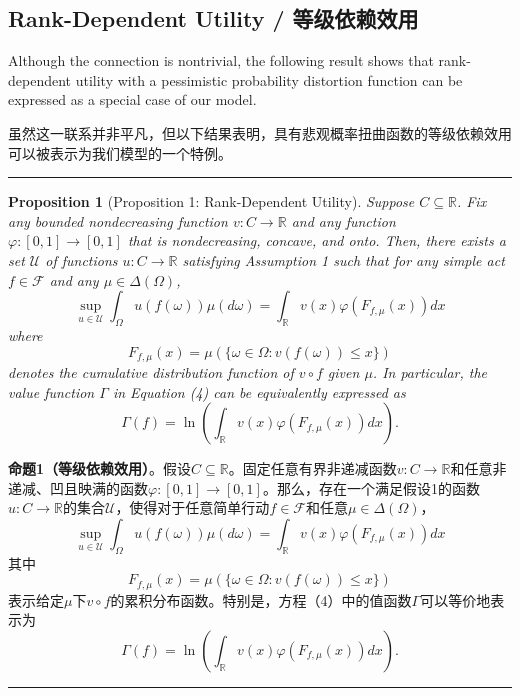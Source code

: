 \documentclass[12pt,a4paper]{article}
\newenvironment{original}
  {\par\noindent\color{black}\smallskip}
  {\par\smallskip}
\newenvironment{translation}
  {\par\noindent\color{blue!70!black}\smallskip}
  {\par\medskip\hrule\medskip}
\newtheorem{proposition}[theorem]{Proposition}
\begin{document}
\subsection{Rank-Dependent Utility / 等级依赖效用}

\begin{original}
Although the connection is nontrivial, the following result shows that rank-dependent utility with a pessimistic probability distortion function can be expressed as a special case of our model.
\end{original}
\begin{translation}
虽然这一联系并非平凡，但以下结果表明，具有悲观概率扭曲函数的等级依赖效用可以被表示为我们模型的一个特例。
\end{translation}

\begin{proposition}[Proposition 1: Rank-Dependent Utility]
Suppose $C \subseteq \mathbb{R}$. Fix any bounded nondecreasing function $v: C \to \mathbb{R}$ and any function $\varphi: [0, 1] \to [0, 1]$ that is nondecreasing, concave, and onto. Then, there exists a set $\mathcal{U}$ of functions $u: C \to \mathbb{R}$ satisfying Assumption 1 such that for any simple act $f \in \mathcal{F}$ and any $\mu \in \Delta(\Omega)$,
\[
\sup_{u \in \mathcal{U}} \int_\Omega u(f(\omega)) \mu(d\omega) = \int_\mathbb{R} v(x) \varphi(F_{f,\mu}(x)) dx
\]
where
\[
F_{f,\mu}(x) = \mu(\{\omega \in \Omega : v(f(\omega)) \leq x\})
\]
denotes the cumulative distribution function of $v \circ f$ given $\mu$. In particular, the value function $\Gamma$ in Equation (4) can be equivalently expressed as
\[
\Gamma(f) = \ln\left( \int_\mathbb{R} v(x) \varphi(F_{f,\mu}(x)) dx \right).
\]
\end{proposition}
\begin{translation}
\textbf{命题1（等级依赖效用）}。假设$C \subseteq \mathbb{R}$。固定任意有界非递减函数$v: C \to \mathbb{R}$和任意非递减、凹且映满的函数$\varphi: [0, 1] \to [0, 1]$。那么，存在一个满足假设1的函数$u: C \to \mathbb{R}$的集合$\mathcal{U}$，使得对于任意简单行动$f \in \mathcal{F}$和任意$\mu \in \Delta(\Omega)$，
\[
\sup_{u \in \mathcal{U}} \int_\Omega u(f(\omega)) \mu(d\omega) = \int_\mathbb{R} v(x) \varphi(F_{f,\mu}(x)) dx
\]
其中
\[
F_{f,\mu}(x) = \mu(\{\omega \in \Omega : v(f(\omega)) \leq x\})
\]
表示给定$\mu$下$v \circ f$的累积分布函数。特别是，方程（4）中的值函数$\Gamma$可以等价地表示为
\[
\Gamma(f) = \ln\left( \int_\mathbb{R} v(x) \varphi(F_{f,\mu}(x)) dx \right).
\]
\end{translation}
\end{document}
